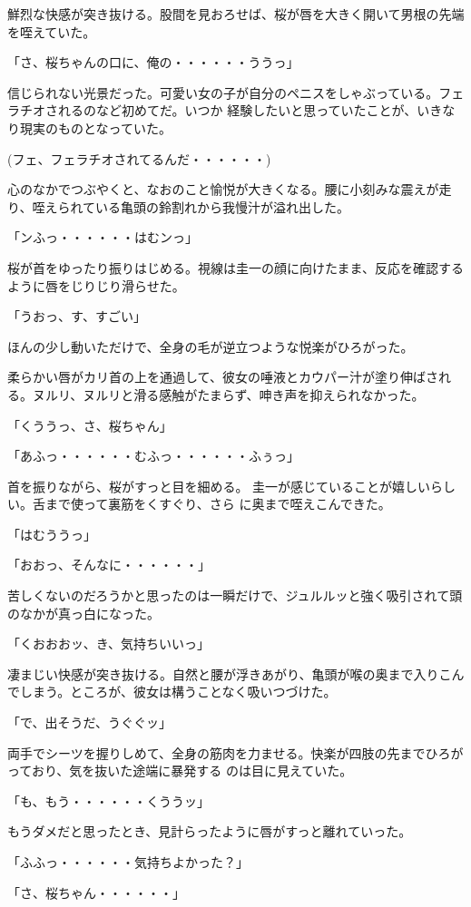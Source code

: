 ﻿\documentclass[book,tate]{jlreq}
\begin{document}
鮮烈な快感が突き抜ける。股間を見おろせば、桜が唇を大きく開いて男根の先端を咥えていた。

「さ、桜ちゃんの口に、俺の・・・・・・ううっ」

信じられない光景だった。可愛い女の子が自分のペニスをしゃぶっている。フェラチオされるのなど初めてだ。いつか 経験したいと思っていたことが、いきなり現実のものとなっていた。

(フェ、フェラチオされてるんだ・・・・・・)

心のなかでつぶやくと、なおのこと愉悦が大きくなる。腰に小刻みな震えが走り、咥えられている亀頭の鈴割れから我慢汁が溢れ出した。

「ンふっ・・・・・・はむンっ」

桜が首をゆったり振りはじめる。視線は圭一の顔に向けたまま、反応を確認するように唇をじりじり滑らせた。

「うおっ、す、すごい」

ほんの少し動いただけで、全身の毛が逆立つような悦楽がひろがった。

柔らかい唇がカリ首の上を通過して、彼女の唾液とカウパー汁が塗り伸ばされる。ヌルリ、ヌルリと滑る感触がたまらず、呻き声を抑えられなかった。

「くううっ、さ、桜ちゃん」

「あふっ・・・・・・むふっ・・・・・・ふぅっ」

首を振りながら、桜がすっと目を細める。 圭一が感じていることが嬉しいらしい。舌まで使って裏筋をくすぐり、さら に奥まで咥えこんできた。

「はむううっ」

「おおっ、そんなに・・・・・・」

苦しくないのだろうかと思ったのは一瞬だけで、ジュルルッと強く吸引されて頭のなかが真っ白になった。

「くおおおッ、き、気持ちいいっ」

凄まじい快感が突き抜ける。自然と腰が浮きあがり、亀頭が喉の奥まで入りこんでしまう。ところが、彼女は構うことなく吸いつづけた。

「で、出そうだ、うぐぐッ」

両手でシーツを握りしめて、全身の筋肉を力ませる。快楽が四肢の先までひろがっており、気を抜いた途端に暴発する のは目に見えていた。

「も、もう・・・・・・くううッ」

もうダメだと思ったとき、見計らったように唇がすっと離れていった。

「ふふっ・・・・・・気持ちよかった？」

「さ、桜ちゃん・・・・・・」
\end{document}
